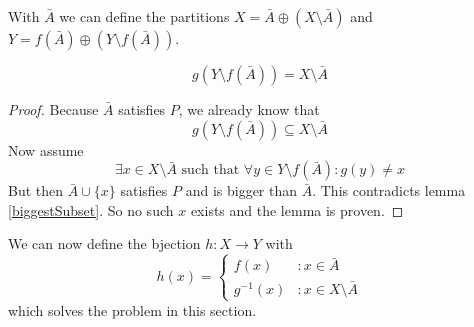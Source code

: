 With $\bar{A}$ we can define the partitions $X=\bar{A} \oplus (X \setminus \bar{A})$ and $Y=f(\bar{A}) \oplus (Y \setminus f(\bar{A}))$.

\begin{lem}
$$
g(Y \setminus f(\bar{A})) = X \setminus \bar{A}
$$
\end{lem}

\begin{proof}
Because $\bar{A}$ satisfies $P$, we already know that 
$$
g(Y \setminus f(\bar{A})) \subseteq X \setminus \bar{A}
$$
Now assume
$$
\exists x \in X \setminus \bar{A} \text{ such that } \forall y \in Y \setminus f(\bar{A}): g(y) \neq x
$$
But then $\bar{A} \cup \{x\}$ satisfies $P$ 
 and is bigger than $\bar{A}$. This contradicts lemma \ref{biggestSubset}. So no such $x$ exists and the lemma is proven.
\end{proof}


We can now define the bjection $h: X \to Y$ with
$$
h(x) = \begin{cases}
         f(x) & : x \in \bar{A}\\
         g^{-1}(x) & : x \in X \setminus \bar{A}
      \end{cases} 
$$
which solves the problem in this section. 






